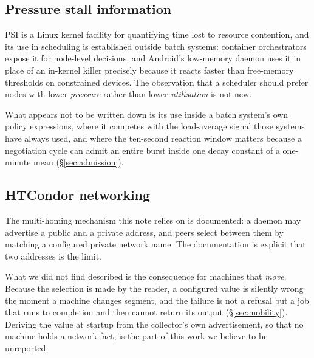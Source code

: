 \subsection{Pressure stall information}

PSI is a Linux kernel facility for quantifying time lost to resource contention,
and its use in scheduling is established outside batch systems: container
orchestrators expose it for node-level decisions, and Android's low-memory
daemon uses it in place of an in-kernel killer precisely because it reacts
faster than free-memory thresholds on constrained devices. The observation that
a scheduler should prefer nodes with lower \emph{pressure} rather than lower
\emph{utilisation} is not new.

What appears not to be written down is its use inside a batch system's own
policy expressions, where it competes with the load-average signal those systems
have always used, and where the ten-second reaction window matters because a
negotiation cycle can admit an entire burst inside one decay constant of a
one-minute mean (\S\ref{sec:admission}).

\subsection{HTCondor networking}

The multi-homing mechanism this note relies on is documented: a daemon may
advertise a public and a private address, and peers select between them by
matching a configured private network name. The documentation is explicit that
two addresses is the limit.

What we did not find described is the consequence for machines that \emph{move}.
Because the selection is made by the reader, a configured value is silently
wrong the moment a machine changes segment, and the failure is not a refusal but
a job that runs to completion and then cannot return its output
(\S\ref{sec:mobility}). Deriving the value at startup from the collector's own
advertisement, so that no machine holds a network fact, is the part of this work
we believe to be unreported.
